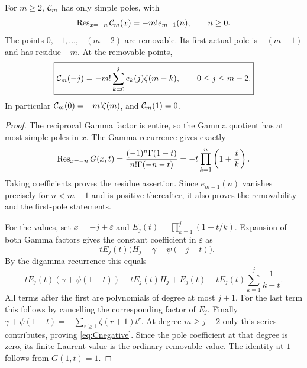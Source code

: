 \begin{theorem}\label{thm:Cpoles}
For $m\ge2$, $\mathcal C_m$ has only simple poles, with
\begin{equation}\label{eq:Cresidue}
 \operatorname{Res}_{x=-n}\mathcal C_m(x)=-m!e_{m-1}(n),\qquad n\ge0.
\end{equation}
The points $0,-1,\ldots,-(m-2)$ are removable. Its first actual pole
is $-(m-1)$ and has residue $-m$. At the removable points,
\begin{equation}\label{eq:Cnegative}
 \boxed{\displaystyle
 \mathcal C_m(-j)=-m!\sum_{k=0}^j e_k(j)\zeta(m-k),
       \qquad 0\le j\le m-2.}
\end{equation}
In particular $\mathcal C_m(0)=-m!\zeta(m)$, and $\mathcal C_m(1)=0$.
\end{theorem}
\begin{proof}
The reciprocal Gamma factor is entire, so the Gamma quotient has
at most simple poles in $x$. The Gamma recurrence gives exactly
\[
 \operatorname{Res}_{x=-n}G(x,t)
 =\frac{(-1)^n\Gamma(1-t)}{n!\Gamma(-n-t)}
 =-t\prod_{k=1}^n\left(1+\frac tk\right).
\]
Taking coefficients proves the residue assertion. Since $e_{m-1}(n)$
vanishes precisely for $n<m-1$ and is positive thereafter, it also
proves the removability and the first-pole statements.

For the values, set $x=-j+\varepsilon$ and
$E_j(t)=\prod_{k=1}^j(1+t/k)$. Expansion of both Gamma factors gives
the constant coefficient in $\varepsilon$ as
\[
 -tE_j(t)\bigl(H_j-\gamma-\psi(-j-t)\bigr).
\]
By the digamma recurrence this equals
\begin{equation}\label{eq:Cnegativeproof}
 tE_j(t)(\gamma+\psi(1-t))
 -tE_j(t)H_j+E_j(t)+tE_j(t)\sum_{k=1}^j\frac1{k+t}.
\end{equation}
All terms after the first are polynomials of degree at most $j+1$.
For the last term this follows by cancelling the corresponding factor
of $E_j$. Finally
$\gamma+\psi(1-t)=-\sum_{r\ge1}\zeta(r+1)t^r$.
At degree $m\ge j+2$ only this series contributes, proving
\eqref{eq:Cnegative}. Since the pole coefficient at that degree is
zero, its finite Laurent value is the ordinary removable value.
The identity at $1$ follows from $G(1,t)=1$.
\end{proof}

